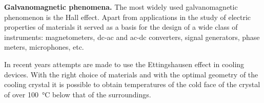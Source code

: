 \textbf{Galvanomagnetic phenomena.} The most widely used galvanomagnetic phenomenon is the Hall effect. Apart from applications in the study of electric properties of materials it served as a basis for the design of a wide class of instruments: magnetometers, dc-ac and ac-dc converters, signal generators, phase meters, microphones, etc.

In recent years attempts are made to use the Ettingshausen effect in cooling devices. With the right choice of materials and with the optimal geometry of the cooling crystal it is possible to obtain temperatures of the cold face of the crystal of over \SI{100}{\degreeCelsius} below that of the surroundings.


